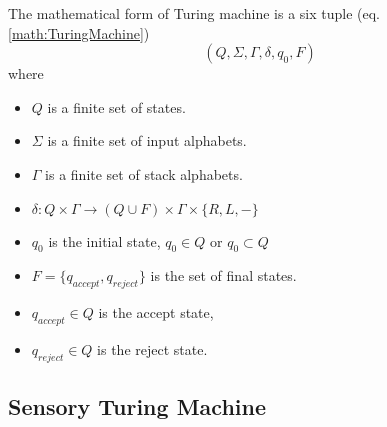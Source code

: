 The mathematical form of Turing machine is a six tuple  (eq. \ref{math:TuringMachine})
\begin{equation}\label{math:TuringMachine}
    (Q, \Sigma, \Gamma, \delta, q_0, F)
\end{equation}
where
\begin{itemize}
    \item $Q$ is a finite set of states.
    \item $\Sigma$ is a finite set of input alphabets.
    \item $\Gamma$ is a finite set of stack alphabets.
    \item $\delta: Q \times \Gamma \to (Q \cup F) \times \Gamma \times \{R, L, -\}$
    \item $q_0$ is the initial state, $q_0\in Q$ or $q_0\subset Q$
    \item $F = \{q_{accept}, q_{reject}\}$ is the set of final states.
    \item $q_{accept} \in Q$ is the accept state,
    \item $q_{reject} \in Q$ is the reject state.
\end{itemize}

\subsection{Sensory Turing Machine}


